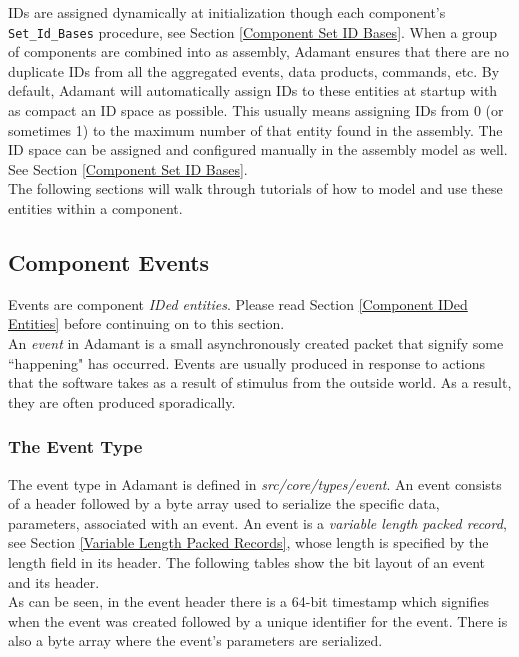 IDs are assigned dynamically at initialization though each component's \texttt{Set\_Id\_Bases} procedure, see Section \ref{Component Set ID Bases}. When a group of components are combined into as assembly, Adamant ensures that there are no duplicate IDs from all the aggregated events, data products, commands, etc. By default, Adamant will automatically assign IDs to these entities at startup with as compact an ID space as possible. This usually means assigning IDs from 0 (or sometimes 1) to the maximum number of that entity found in the assembly. The ID space can be assigned and configured manually in the assembly model as well. See Section \ref{Component Set ID Bases}. \\

The following sections will walk through tutorials of how to model and use these entities within a component.

\subsection{Component Events}

Events are component \textit{IDed entities}. Please read Section \ref{Component IDed Entities} before continuing on to this section. \\

An \textit{event} in Adamant is a small asynchronously created packet that signify some ``happening" has occurred. Events are usually produced in response to actions that the software takes as a result of stimulus from the outside world. As a result, they are often produced sporadically.

\subsubsection{The Event Type}

The event type in Adamant is defined in \textit{src/core/types/event}. An event consists of a header followed by a byte array used to serialize the specific data, parameters, associated with an event. An event is a \textit{variable length packed record}, see Section \ref{Variable Length Packed Records}, whose length is specified by the length field in its header. The following tables show the bit layout of an event and its header. \\




As can be seen, in the event header there is a 64-bit timestamp which signifies when the event was created followed by a unique identifier for the event. There is also a byte array where the event's parameters are serialized. \\

